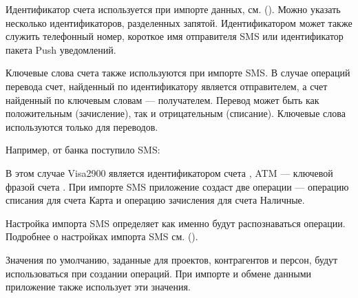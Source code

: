 \documentclass[a4paper,10pt,russian]{sphinxmanual}
\begin{document}
Идентификатор счета используется при импорте данных, см. {\hyperref[\detokenize{import:chapter-import}]{}} (). Можно указать несколько
идентификаторов, разделенных запятой. Идентификатором может также служить телефонный номер, короткое имя отправителя SMS
или идентификатор пакета Push уведомлений.

Ключевые слова счета также используются при импорте SMS. В случае операций перевода счет, найденный по идентификатору
является отправителем, а счет найденный по ключевым словам — получателем. Перевод может быть как положительным
(зачисление), так и отрицательным (списание). Ключевые слова используются только для переводов.

Например, от банка поступило SMS:

\begin{sphinxVerbatim}[commandchars=\\\{\}]
         
\end{sphinxVerbatim}

В этом случае Visa2900 является идентификатором счета , ATM — ключевой фразой счета . При импорте SMS приложение создаст
две операции — операцию списания для счета Карта и операцию зачисления для счета Наличные.

Настройка импорта SMS определяет как именно будут распознаваться операции.
Подробнее о настройках импорта SMS см. {\hyperref[\detokenize{notifications:chapter-notifications}]{}} ().

Значения по умолчанию, заданные для проектов, контрагентов и персон, будут использоваться при создании операций. При
импорте и обмене данными приложение также использует эти значения.

\noindent{}
\noindent{}
\noindent{}
\end{document}
